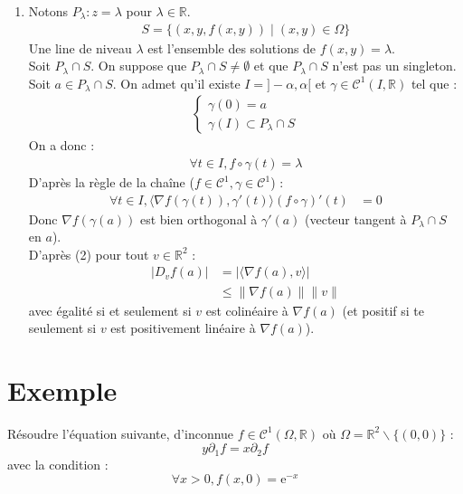 \documentclass[../main.tex]{subfiles}
\begin{document}
\begin{enumerate}
    \item Notons $P_\lambda: z = \lambda$ pour $\lambda \in \mathbb{R}$. 
    \begin{align*}
        S = \{ (x, y, f(x, y)) \mid (x, y)\in \Omega \}
    \end{align*}
    Une line de niveau $\lambda$ est l'ensemble des solutions de $f(x, y) = \lambda$. \\
    Soit $P_\lambda\cap S$. On suppose que $P_\lambda\cap S \neq \emptyset$ et que $P_\lambda\cap S$ n'est pas un singleton. \\
    Soit $a\in P_\lambda\cap S$. On admet qu'il existe $I = ]-\alpha, \alpha[$ et $\gamma\in \mathcal{C}^1(I, \mathbb{R})$ tel que :
    \begin{align*}
        \begin{cases}
            \gamma(0) = a \\
            \gamma(I) \subset P_\lambda\cap S
        \end{cases}
    \end{align*}
    On a donc : 
    \begin{align*}
        \forall t\in I, f\circ \gamma(t) = \lambda
    \end{align*}
    D'après la règle de la chaîne ($f\in \mathcal{C}^1, \gamma\in \mathcal{C}^1$) : 
    \begin{align*}
        \forall t\in I, \langle \nabla f(\gamma(t)), \gamma'(t)\rangle (f\circ \gamma)'(t) &= 0
    \end{align*}
    Donc $\nabla f(\gamma(a))$ est bien orthogonal à $\gamma'(a)$ (vecteur tangent à $P_\lambda\cap S$ en $a$). \\
    D'après (2) pour tout $v\in \mathbb{R}^2$ : 
    \begin{align*}
        |D_v f(a)| &= |\langle \nabla f(a), v\rangle| \\
        &\leq \| \nabla f(a) \| \|v\|
    \end{align*}
    avec égalité si et seulement si $v$ est colinéaire à $\nabla f(a)$ (et positif si te seulement si $v$ est positivement linéaire à $\nabla f(a)$). 
\end{enumerate}

\section{Exemple}
\begin{tcolorbox}[title=Exemple 36.49, title filled=false, colframe=darkgreen, colback=darkgreen!10!white]
    Résoudre l'équation suivante, d'inconnue $f \in \mathcal{C}^1(\Omega, \mathbb{R})$ où $\Omega=\mathbb{R}^2 \backslash\{(0,0)\}$ :
    $$y \partial_1 f=x \partial_2 f$$
    avec la condition :
    $$\forall x>0, f(x, 0)=\mathrm{e}^{-x}$$
\end{tcolorbox}
\end{document}
